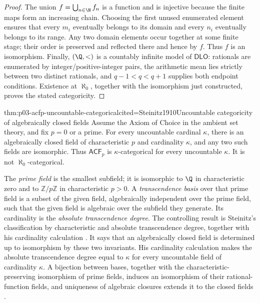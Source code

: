 \begin{proof}
The union \(f=\bigcup_{n\in\N}f_n\) is a function and is injective
because the finite maps form an increasing chain.  Choosing the first
unused enumerated element ensures that every \(m_i\) eventually belongs
to its domain and every \(n_i\) eventually belongs to its range.  Any
two domain elements occur together at some finite stage; their order is
preserved and reflected there and hence by \(f\).  Thus \(f\) is an
isomorphism.  Finally, \((\Q,<)\) is a countably infinite model of
\(\mathsf{DLO}\): rationals are enumerated by integer/positive-integer
pairs, the arithmetic mean lies strictly between two distinct rationals,
and \(q-1<q<q+1\) supplies both endpoint conditions.  Existence at
\(\aleph_0\), together with the isomorphism just constructed, proves
the stated categoricity.
\end{proof}

\begin{hbtheorem}{thm:p03-acfp-uncountable-categorical}{cited=Steinitz1910}{Uncountable categoricity of algebraically closed fields}
Assume the Axiom of Choice in the ambient set theory, and fix \(p=0\) or
a prime.  For every uncountable cardinal \(\kappa\), there is an
algebraically closed field of characteristic \(p\) and cardinality
\(\kappa\), and any two such fields are isomorphic.  Thus
\(\mathsf{ACF}_p\) is \(\kappa\)-categorical for every uncountable
\(\kappa\).  It is not \(\aleph_0\)-categorical.
\end{hbtheorem}

The \emph{prime field} is the smallest subfield; it is isomorphic to
\(\Q\) in characteristic zero and to \(\mathbb Z/p\mathbb Z\) in
characteristic \(p>0\).  A \emph{transcendence basis} over that prime
field is a subset of the given field, algebraically independent over the
prime field, such that the given field is algebraic over the subfield they
generate.  Its cardinality is the \emph{absolute transcendence degree}.
The controlling result is Steinitz's classification by characteristic and
absolute transcendence degree, together with his cardinality calculation
\cite[\S23(6), pp.~300--301, and \S24, p.~301]{Steinitz1910}.
It says that an algebraically closed field is
determined up to isomorphism by these two invariants.  His cardinality
calculation makes the absolute transcendence degree equal to \(\kappa\)
for every uncountable field of cardinality \(\kappa\).  A bijection
between bases, together with the characteristic-preserving isomorphism of
prime fields, induces an isomorphism of their rational-function fields,
and uniqueness of algebraic closures extends it to the closed fields
\cite[\S21(9), p.~287, and \S22(5), p.~289]{Steinitz1910}.


